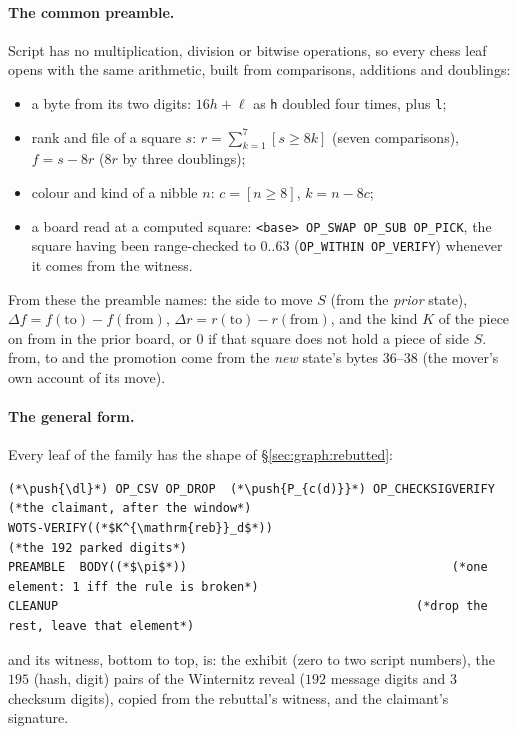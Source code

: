 \documentclass[11pt]{article}
\newcommand{\push}[1]{\ensuremath{\langle #1\rangle}}
\newcommand{\dl}{\delta}
\begin{document}
\paragraph{The common preamble.} Script has no multiplication, division
or bitwise operations, so every chess leaf opens with the same
arithmetic, built from comparisons, additions and doublings:
\begin{itemize}[nosep]
\item a byte from its two digits: $16h + \ell$ as \texttt{h} doubled
  four times, plus \texttt{l};
\item rank and file of a square $s$: $r = \sum_{k=1}^{7} [s \ge 8k]$
  (seven comparisons), $f = s - 8r$ ($8r$ by three doublings);
\item colour and kind of a nibble $n$: $c = [n \ge 8]$, $k = n - 8c$;
\item a board read at a computed square: \texttt{<base> OP\_SWAP
  OP\_SUB OP\_PICK}, the square having been range-checked to $0..63$
  (\texttt{OP\_WITHIN OP\_VERIFY}) whenever it comes from the witness.
\end{itemize}
From these the preamble names: the side to move $S$ (from the
\emph{prior} state), $\Delta f = f(\text{to}) - f(\text{from})$,
$\Delta r = r(\text{to}) - r(\text{from})$, and the kind $K$ of the
piece on from in the prior board, or $0$ if that square does not hold a
piece of side $S$. from, to and the promotion come from the
\emph{new} state's bytes 36--38 (the mover's own account of its move).

\paragraph{The general form.} Every leaf of the family has the shape
of \S\ref{sec:graph:rebutted}:
\begin{lstlisting}[style=script]
(*\push{\dl}*) OP_CSV OP_DROP  (*\push{P_{c(d)}}*) OP_CHECKSIGVERIFY      (*the claimant, after the window*)
WOTS-VERIFY((*$K^{\mathrm{reb}}_d$*))                             (*the 192 parked digits*)
PREAMBLE  BODY((*$\pi$*))                                     (*one element: 1 iff the rule is broken*)
CLEANUP                                                  (*drop the rest, leave that element*)
\end{lstlisting}
and its witness, bottom to top, is: the exhibit (zero to two script
numbers), the $195$ (hash, digit) pairs of the Winternitz reveal
($192$ message digits and $3$ checksum digits), copied from the
rebuttal's witness, and the claimant's signature.
\end{document}
